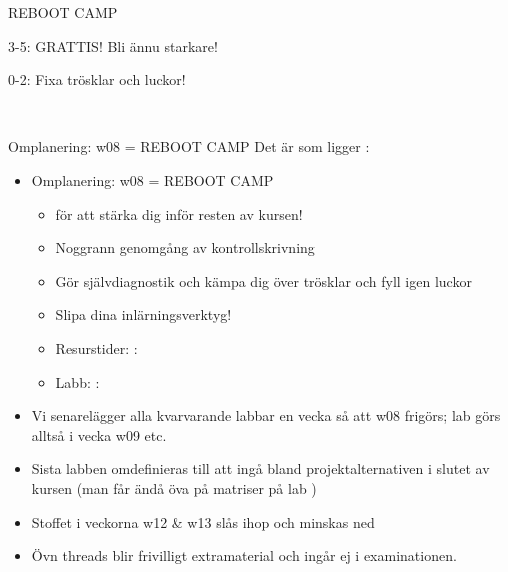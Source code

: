 
\begin{Slide}{REBOOT CAMP}
\huge 

3-5: GRATTIS! Bli ännu starkare!

0-2: Fixa trösklar och luckor!

\vspace{0.5em}  \\\vspace{0.5em} 
\end{Slide}


\begin{Slide}{Omplanering: w08 = REBOOT CAMP}\SlideFontSmall
Det är  som ligger : \\
\begin{itemize}
\item Omplanering: w08 = REBOOT CAMP
\begin{itemize}\SlideFontTiny
\item {} för att stärka dig inför resten av kursen!
\item Noggrann genomgång av kontrollskrivning
\item Gör självdiagnostik och kämpa dig över trösklar och fyll igen luckor
\item Slipa dina inlärningsverktyg! 
\item Resurstider: : 
\item Labb: : 
\end{itemize}
\item Vi senarelägger alla kvarvarande labbar en vecka så att w08 frigörs;
 lab  görs alltså i vecka w09 etc.

\item Sista labben  omdefinieras till att ingå bland projektalternativen i slutet av kursen (man får ändå öva på matriser på lab )

\item Stoffet i veckorna w12 \& w13 slås ihop och minskas ned

\item Övn threads blir frivilligt extramaterial och ingår ej i examinationen.

\end{itemize}
\end{Slide}



